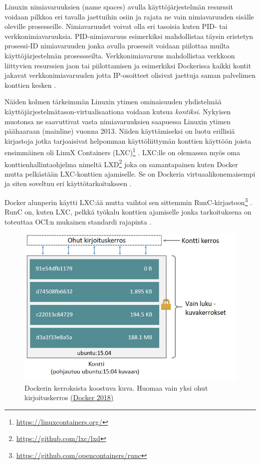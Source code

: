 \documentclass[finnish,gradu]{tktltiki3}
\begin{document}
    Linuxin nimiavaruuksien (name spaces) avulla käyttöjärjestelmän resurssit voidaan pilkkoa eri tavalla jaettuihin osiin ja rajata ne vain nimiavaruuden sisälle oleville prosesseille. Nimiavaruudet voivat olla eri tasoisia kuten PID- tai verkkonimiavaruuksia. PID-nimiavaruus esimerkiksi mahdollistaa täysin eristetyn prosessi-ID nimiavaruuden jonka avulla prosessit voidaan piilottaa muilta käyttöjärjestelmän prosessseilta. Verkkonimiavaruus mahdollistaa verkkoon liittyvien resurssien jaon tai piilottamisen ja esimerkiksi Dockerissa kaikki kontit jakavat verkkonimiavaruuden jotta IP-osoitteet olisivat jaettuja saman palvelimen konttien kesken \cite{containers-vs-vms}.
    
    Näiden kolmen tärkeimmän Linuxin ytimen ominaisuuden yhdistelmää käyttöjärjestelmätason-virtualisaationa voidaan kutsua \textit{kontiksi}. Nykyisen muotonsa ne saavuttivat vasta nimiavaruuksien saapuessa Linuxin ytimen päähaaraan (mainline) vuonna 2013. Niiden käyttämiseksi on luotu erillisiä kirjastoja jotka tarjoaisivat helpomman käyttöliittymän konttien käyttöön joista ensimmäinen oli LinuX Containers (LXC)\footnote{\url{https://linuxcontainers.org/}} \cite{docker}. LXC:lle on olemasssa myös oma konttienhallintaohjelma nimeltä LXD\footnote{\url{https://github.com/lxc/lxd}} joka on samantapainen kuten Docker mutta pelkästään LXC-konttien ajamiselle. Se on Dockeria virtuaalikonemaisempi ja siten soveltuu eri käyttötarkoitukseen \cite{lxd}.
    
    Docker alunperin käytti LXC:ää mutta vaihtoi sen sittemmin RunC-kirjastoon\footnote{\url{https://github.com/opencontainers/runc}} \cite{introducing-runc}. RunC on, kuten LXC, pelkkä työkalu konttien ajamiselle jonka tarkoituksena on toteuttaa OCI:n mukainen standardi rajapinta \cite{runc-blog}.
    
    \begin{figure}[h]
        \centering
        \includegraphics[width=1\textwidth]{images/container-layers.jpg}
        \caption{Dockerin kerroksista koostuva kuva. Huomaa vain yksi ohut kirjoituskerros \href{https://docs.docker.com/storage/storagedriver/\#images-and-layers}{(Docker 2018)}}
        \label{fig:container-layers}
    \end{figure}
    
\end{document}
